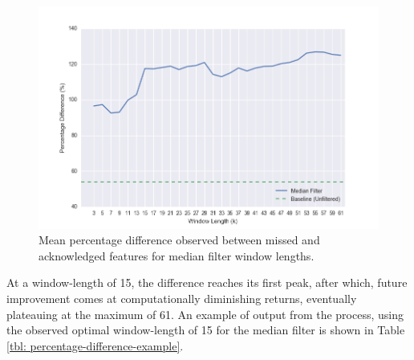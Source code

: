 \begin{figure}[]
    \centering
        \includegraphics[scale=0.65, angle=0]{Files/treatment-study-1/figures/filter_window_length}
        \caption{Mean percentage difference observed between missed and acknowledged features for median filter window lengths.}
        \label{fig: filter-percentage-difference}
\end{figure}

At a window-length of 15, the difference reaches its first peak, after which, future improvement comes at computationally diminishing returns, eventually plateauing at the maximum of 61. An example of output from the process, using the observed optimal window-length of 15 for the median filter is shown in Table \ref{tbl: percentage-difference-example}.

